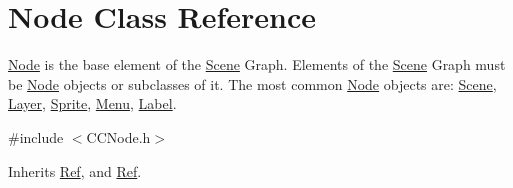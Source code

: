 \hypertarget{classNode}{}\section{Node Class Reference}
\label{classNode}


\hyperlink{classNode}{Node} is the base element of the \hyperlink{classScene}{Scene} Graph. Elements of the \hyperlink{classScene}{Scene} Graph must be \hyperlink{classNode}{Node} objects or subclasses of it. The most common \hyperlink{classNode}{Node} objects are\+: \hyperlink{classScene}{Scene}, \hyperlink{classLayer}{Layer}, \hyperlink{classSprite}{Sprite}, \hyperlink{classMenu}{Menu}, \hyperlink{classLabel}{Label}.  




{\ttfamily \#include $<$C\+C\+Node.\+h$>$}



Inherits \hyperlink{classRef}{Ref}, and \hyperlink{classRef}{Ref}.




